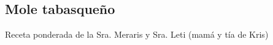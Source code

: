 \subsection{Mole tabasqueño}

Receta ponderada de la Sra. Meraris y Sra. Leti (mamá y tía de Kris)









